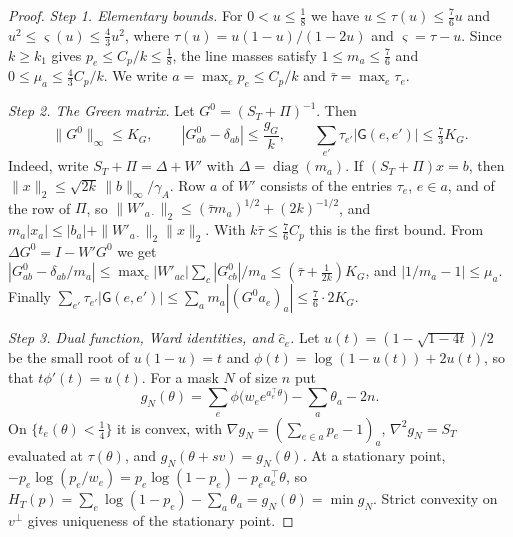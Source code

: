 \begin{proof}
\emph{Step 1. Elementary bounds.} For $0<u\le\tfrac18$ we have $u\le\tau(u)\le\tfrac76u$ and
$u^2\le\varsigma(u)\le\tfrac43u^2$, where $\tau(u)=u(1-u)/(1-2u)$ and $\varsigma=\tau-u$. Since
$k\ge k_1$ gives $p_e\le C_p/k\le\tfrac18$, the line masses satisfy $1\le m_a\le\tfrac76$ and
$0\le\mu_a\le\tfrac43C_p/k$. We write $a=\max_ep_e\le C_p/k$ and $\bar\tau=\max_e\tau_e$.

\emph{Step 2. The Green matrix.} Let $G^0=(S_T+\Pi)^{-1}$. Then
\begin{equation}\label{eq:green-torres}
 \|G^0\|_\infty\le K_G,\qquad |G^0_{ab}-\delta_{ab}|\le\frac{g_G}{k},\qquad
 \sum_{e'}\tau_{e'}|\mathsf G(e,e')|\le\tfrac73K_G .
\end{equation}
Indeed, write $S_T+\Pi=\Delta+W'$ with $\Delta=\operatorname{diag}(m_a)$. If $(S_T+\Pi)x=b$, then
$\|x\|_2\le\sqrt{2k}\,\|b\|_\infty/\gamma_A$. Row $a$ of $W'$ consists of the entries $\tau_e$, $e\in a$,
and of the row of $\Pi$, so $\|W'_{a\cdot}\|_2\le(\bar\tau m_a)^{1/2}+(2k)^{-1/2}$, and
$m_a|x_a|\le|b_a|+\|W'_{a\cdot}\|_2\|x\|_2$. With $k\bar\tau\le\tfrac76C_p$ this is the first bound. From
$\Delta G^0=I-W'G^0$ we get $|G^0_{ab}-\delta_{ab}/m_a|\le\max_c|W'_{ac}|\sum_c|G^0_{cb}|/m_a
\le(\bar\tau+\tfrac1{2k})K_G$, and $|1/m_a-1|\le\mu_a$. Finally
$\sum_{e'}\tau_{e'}|\mathsf G(e,e')|\le\sum_am_a|(G^0a_e)_a|\le\tfrac76\cdot2K_G$.

\emph{Step 3. Dual function, Ward identities, and $\hat c_e$.} Let $u(t)=(1-\sqrt{1-4t})/2$ be the small
root of $u(1-u)=t$ and $\phi(t)=\log(1-u(t))+2u(t)$, so that $t\phi'(t)=u(t)$. For a mask $N$ of size
$n$ put
\[
 g_N(\theta)=\sum_e\phi\bigl(w_ee^{a_e^\top\theta}\bigr)-\sum_a\theta_a-2n .
\]
On $\{t_e(\theta)<\tfrac14\}$ it is convex, with $\nabla g_N=(\sum_{e\in a}p_e-1)_a$,
$\nabla^2g_N=S_T$ evaluated at $\tau(\theta)$, and $g_N(\theta+sv)=g_N(\theta)$. At a stationary point,
$-p_e\log(p_e/w_e)=p_e\log(1-p_e)-p_ea_e^\top\theta$, so $H_T(p)=\sum_e\log(1-p_e)-\sum_a\theta_a
=g_N(\theta)=\min g_N$. Strict convexity on $v^\perp$ gives uniqueness of the stationary point.


\end{proof}

